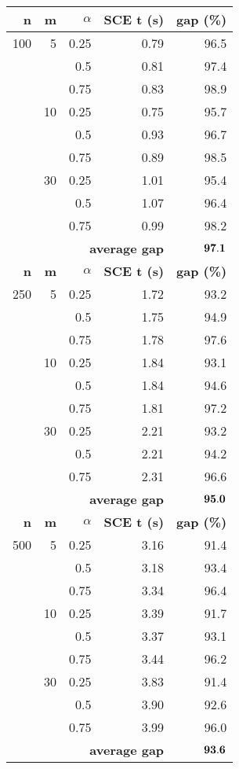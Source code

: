 \renewcommand{\arraystretch}{1.5}%
\fontsize{8.5pt}{1em}\selectfont 
\begin{center}
\begin{tabular}{|r|r|r|rr|} \hline
\textbf{n}   & \textbf{m}  & \textbf{$\alpha$} & \textbf{SCE t (s)} & \textbf{gap (\%)} \\ \hline
100 & 5 & 0.25 & 0.79 & 96.5 \\
    &   & 0.5 & 0.81 & 97.4 \\
    &   & 0.75 & 0.83 & 98.9 \\ \cline{2-5}
    & 10 & 0.25 & 0.75 & 95.7 \\
    &    & 0.5 & 0.93 & 96.7 \\
    &    & 0.75 & 0.89 & 98.5 \\ \cline{2-5}
    & 30 & 0.25 & 1.01 & 95.4 \\
    &    & 0.5 & 1.07 & 96.4 \\
    &    & 0.75 & 0.99 & 98.2 \\ \cline{2-5}
    & \multicolumn{3}{r}{\textbf{average gap}}  & $\bf 97.1$  \\ \hline \hline
\textbf{n}   & \textbf{m}  & \textbf{$\alpha$} & \textbf{SCE t (s)} & \textbf{gap (\%)} \\ \hline
250 & 5 & 0.25 & 1.72 & 93.2 \\
    &   & 0.5 & 1.75 & 94.9 \\
    &   & 0.75 & 1.78 & 97.6 \\ \cline{2-5}
    & 10 & 0.25 & 1.84 & 93.1 \\
    &    & 0.5 & 1.84 & 94.6 \\
    &    & 0.75 & 1.81 & 97.2 \\ \cline{2-5}
    & 30 & 0.25 & 2.21 & 93.2 \\
    &    & 0.5 & 2.21 & 94.2 \\
    &    & 0.75 & 2.31 & 96.6 \\ \cline{2-5}
    & \multicolumn{3}{r}{\textbf{average gap}}  & $\bf 95.0$  \\ \hline \hline
\textbf{n}   & \textbf{m}  & \textbf{$\alpha$} & \textbf{SCE t (s)} & \textbf{gap (\%)} \\ \hline
500 & 5 & 0.25 & 3.16 & 91.4 \\
    &   & 0.5 & 3.18 & 93.4 \\
    &   & 0.75 & 3.34 & 96.4 \\ \cline{2-5}
    & 10 & 0.25 & 3.39 & 91.7 \\
    &    & 0.5 & 3.37 & 93.1 \\
    &    & 0.75 & 3.44 & 96.2 \\ \cline{2-5}
    & 30 & 0.25 & 3.83 & 91.4 \\
    &    & 0.5 & 3.90 & 92.6 \\
    &    & 0.75 & 3.99 & 96.0 \\ \cline{2-5}
    & \multicolumn{3}{r}{\textbf{average gap}}  & $\bf 93.6$  \\ \hline
\end{tabular}
\end{center}
